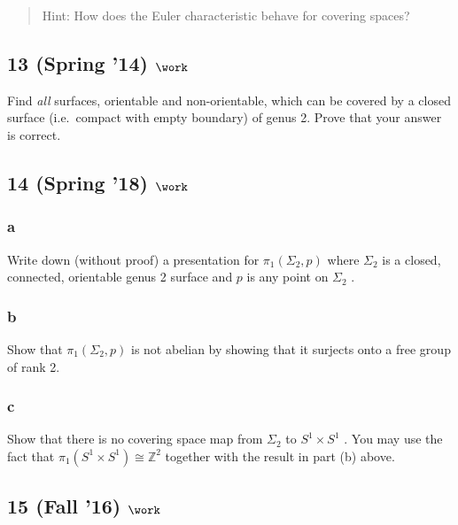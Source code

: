 \begin{quote}
Hint: How does the Euler characteristic behave for covering spaces?
\end{quote}

\hypertarget{spring-14-work-2}{%
\subsection{\texorpdfstring{13 (Spring '14)
\(\work\)}{13 (Spring '14) \textbackslash work}}\label{spring-14-work-2}}

Find \emph{all} surfaces, orientable and non-orientable, which can be
covered by a closed surface (i.e.~compact with empty boundary) of genus
2. Prove that your answer is correct.

\hypertarget{spring-18-work-2}{%
\subsection{\texorpdfstring{14 (Spring '18)
\(\work\)}{14 (Spring '18) \textbackslash work}}\label{spring-18-work-2}}

\hypertarget{a-24}{%
\subsubsection{a}\label{a-24}}

Write down (without proof) a presentation for \(\pi_1 (\Sigma_2 , p)\)
where \(\Sigma_2\) is a closed, connected, orientable genus 2 surface
and \(p\) is any point on \(\Sigma_2\) .

\hypertarget{b-24}{%
\subsubsection{b}\label{b-24}}

Show that \(\pi_1 (\Sigma_2 , p)\) is not abelian by showing that it
surjects onto a free group of rank 2.

\hypertarget{c-7}{%
\subsubsection{c}\label{c-7}}

Show that there is no covering space map from \(\Sigma_2\) to
\(S^1 \times S^1\) . You may use the fact that
\(\pi_1 (S^1 \times S^1 ) \cong {\mathbb{Z}}^2\) together with the
result in part (b) above.

\hypertarget{fall-16-work-6}{%
\subsection{\texorpdfstring{15 (Fall '16)
\(\work\)}{15 (Fall '16) \textbackslash work}}\label{fall-16-work-6}}

